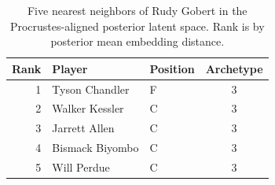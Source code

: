 \begin{table}[htbp]
  \centering\small
  \begin{tabular}{rllc}
    \toprule
    Rank & Player & Position & Archetype \\
    \midrule
    1 & Tyson Chandler & F & 3 \\
    2 & Walker Kessler & C & 3 \\
    3 & Jarrett Allen & C & 3 \\
    4 & Bismack Biyombo & C & 3 \\
    5 & Will Perdue & C & 3 \\
    \bottomrule
  \end{tabular}
  \caption{Five nearest neighbors of Rudy Gobert in the Procrustes-aligned posterior latent space. Rank is by posterior mean embedding distance.}
  \label{tab:Rudy_Gobert_neighbors}
\end{table}

